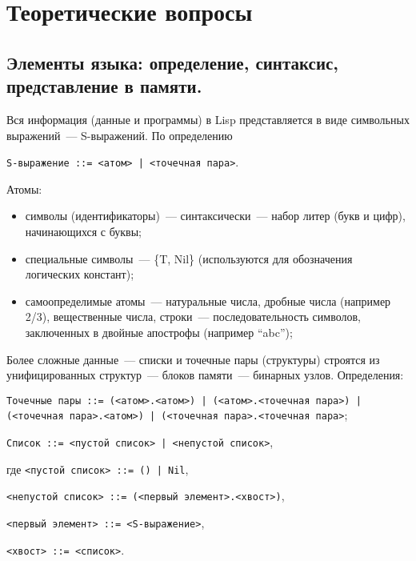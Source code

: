 \chapter{Теоретические вопросы}

\section{Элементы языка: определение, синтаксис, представление в памяти.}

Вся информация (данные и программы) в Lisp представляется в виде символьных выражений~--- S-выражений. По определению
\begin{center}
	\texttt{S-выражение ::= <атом> | <точечная пара>}.
\end{center}

Атомы:
\begin{itemize}
	\item символы (идентификаторы)~--- синтаксически~--- набор литер (букв и цифр), начинающихся с буквы;
	\item специальные символы~--- \{T, Nil\} (используются для обозначения логических констант);
	\item самоопределимые атомы~--- натуральные числа, дробные числа (например 2/3), вещественные числа, строки~--- последовательность символов, заключенных в двойные апострофы (например ``abc'');
\end{itemize}

Более сложные данные~--- списки и точечные пары (структуры) строятся из унифицированных структур~--- блоков памяти~--- бинарных узлов.
Определения:

\begin{flushleft}
	\texttt{Точечные пары ::= (<атом>.<атом>) | (<атом>.<точечная пара>) | (<точечная пара>.<атом>) | (<точечная пара>.<точечная пара>};
\end{flushleft}

\begin{flushleft}
	\texttt{Список ::= <пустой список> | <непустой список>}, 
	
	где \texttt{<пустой список> ::= () | Nil},
	
	\hspace{6.8mm} \texttt{<непустой список> ::= (<первый элемент>.<хвост>)},
	
	\hspace{6.8mm} \texttt{<первый элемент> ::= <S-выражение>},
	
	\hspace{6.8mm} \texttt{<хвост> ::= <список>}.
\end{flushleft}

